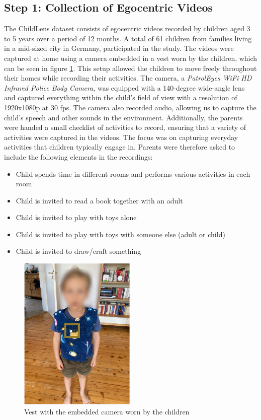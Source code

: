 \documentclass[
  man,floatsintext]{apa6}
\providecommand{\tightlist}{%
  \setlength{\itemsep}{0pt}\setlength{\parskip}{0pt}}
\begin{document}
\subsection{Step 1: Collection of Egocentric Videos}\label{step-1-collection-of-egocentric-videos}

The ChildLens dataset consists of egocentric videos recorded by children aged 3 to 5 years over a period of 12 months. A total of 61 children from families living in a mid-sized city in Germany, participated in the study. The videos were captured at home using a camera embedded in a vest worn by the children, which can be seen in figure \ref{fig:camera-worn}. This setup allowed the children to move freely throughout their homes while recording their activities. The camera, a \emph{PatrolEyes WiFi HD Infrared Police Body Camera}, was equipped with a 140-degree wide-angle lens and captured everything within the child's field of view with a resolution of 1920x1080p at 30 fps. The camera also recorded audio, allowing us to capture the child's speech and other sounds in the environment. Additionally, the parents were handed a small checklist of activities to record, ensuring that a variety of activities were captured in the videos. The focus was on capturing everyday activities that children typically engage in. Parents were therefore asked to include the following elements in the recordings:

\begin{itemize}
\tightlist
\item
  Child spends time in different rooms and performs various activities in each room
\item
  Child is invited to read a book together with an adult
\item
  Child is invited to play with toys alone
\item
  Child is invited to play with toys with someone else (adult or child)
\item
  Child is invited to draw/craft something
\end{itemize}

\begin{figure}

{\centering \includegraphics[width=2.19in]{images/camera_worn} 

}

\caption{Vest with the embedded camera worn by the children}\label{fig:camera-worn}
\end{figure}
\end{document}
